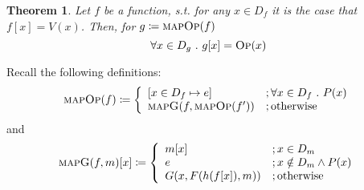 \documentclass{article}
\newtheorem{theorem}{Theorem}[section]
\newcommand{\iteDef}[4]{
  #1 \coloneqq \left\{
\begin{array}{ll}
      #2 &; #3 \\
      #4 &; \text{otherwise}\\
\end{array} 
\right. 
}
\newcommand{\op}{\textsc{Op}}
\newcommand{\mop}{\textsc{mapOp}}
\newcommand{\mapg}{\textsc{mapG}}
\begin{document}

\begin{theorem}
Let $f$ be a function, s.t. for any $x \in D_f$ it is the case that $f[x] = V(x)$. Then, for
$g \coloneqq \mop(f)$
\[
\forall x \in D_g \ .\ g[x] = \op(x)
\]
\end{theorem}
Recall the following definitions:
\[
\iteDef{\mop(f)}{[ x \in D_f \mapsto e ]}{\forall x \in D_f \ .\ P(x)}{\mapg(f, \mop(f'))}
\]
and
\[
\mapg(f, m)[x] \coloneqq \left\{
\begin{array}{ll}
      m[x] &; x \in D_m \\
      e &; x \notin D_m \land P(x) \\
      G(x, F(h(f[x]), m)) &; \text{otherwise}\\
\end{array} 
\right. 
\]
\end{document}
